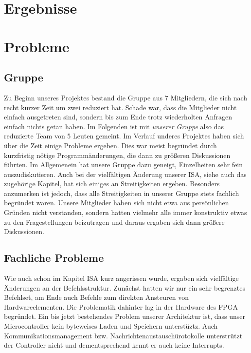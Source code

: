 
\section{Ergebnisse}

\section{Probleme} %

\subsection{Gruppe }
Zu Beginn unseres Projektes bestand die Gruppe aus 7 Mitgliedern, die sich nach recht kurzer Zeit um zwei reduziert hat. Schade war, dass die Mitglieder nicht einfach ausgetreten sind, sondern bis zum Ende trotz wiederholten Anfragen einfach nichts getan haben. Im Folgenden ist mit \textit{unserer Gruppe} also das reduzierte Team von 5 Leuten gemeint.
Im Verlauf underes Projektes haben sich über die Zeit einige Probleme ergeben. Dies war meist begründet durch kurzfristig nötige Programmänderungen, die dann zu größeren Diskussionen führten. Im Allgemenein hat unsere Gruppe dazu geneigt, Einzelheiten sehr fein auszudiskutieren. Auch bei der vielfältigen Änderung unserer ISA, siehe auch das zugehörige Kapitel, hat sich einiges an Streitigkeiten ergeben. Besonders anzumerken ist jedoch, dass alle Streitigkeiten in unserer Gruppe stets fachlich begründet waren. Unsere Mitglieder haben sich nicht etwa aus persönlichen Gründen nicht verstanden, sondern hatten vielmehr alle immer konstruktiv etwas zu den Fragestellungen beizutragen und daraus ergaben sich dann größere Diskussionen.

\subsection{Fachliche Probleme}
Wie auch schon im Kapitel ISA kurz angerissen wurde, ergaben sich vielfältige Änderungen an der Befehlsstruktur. Zunächst hatten wir nur ein sehr begrenztes Befehlset, am Ende auch Befehle zum direkten Ansteuren von Hardwareelementen. Die Problematik dahinter lag in der Hardware des FPGA begründet. 
Ein bis jetzt bestehendes Problem unserer Architektur ist, dass unser Microcontroller kein byteweises Laden und Speichern unterstüztz. Auch Kommunikationsmanagement bzw. Nachrichtenaustauschürotokolle unterstrützt der Controller nicht und dementsprechend kennt er auch keine Interrupts.


